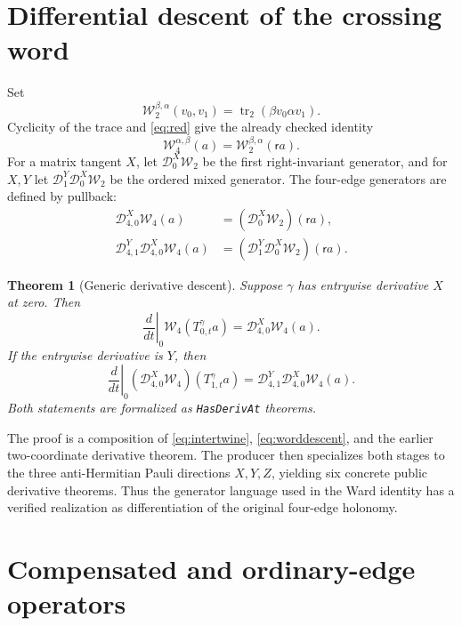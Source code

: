 \documentclass[11pt]{article}
\newtheorem{theorem}{Theorem}[section]
\theoremstyle{definition}
\newcommand{\trn}{\operatorname{tr}_2}
\newcommand{\red}{\mathsf r}
\newcommand{\W}{\mathcal W}
\newcommand{\D}{\mathcal D}
\begin{document}
\section{Differential descent of the crossing word}

Set
\[
 \W_2^{\beta,\alpha}(v_0,v_1)=\trn(\beta v_0\alpha v_1).
\]
Cyclicity of the trace and \eqref{eq:red} give the already checked identity
\begin{equation}\label{eq:worddescent}
 \W_4^{\alpha,\beta}(a)=\W_2^{\beta,\alpha}(\red a).
\end{equation}
For a matrix tangent $X$, let $\D_0^X\W_2$ be the first right-invariant
generator, and for $X,Y$ let $\D_1^Y\D_0^X\W_2$ be the ordered mixed
generator.  The four-edge generators are defined by pullback:
\begin{align}
 \D_{4,0}^{X}\W_4(a)&=(\D_0^X\W_2)(\red a),\label{eq:first}\\
 \D_{4,1}^{Y}\D_{4,0}^{X}\W_4(a)
   &=(\D_1^Y\D_0^X\W_2)(\red a).\label{eq:mixed}
\end{align}

\begin{theorem}[Generic derivative descent]\label{thm:derivative}
Suppose $\gamma$ has entrywise derivative $X$ at zero.  Then
\[
 \left.\frac d{dt}\right|_{0}\W_4(T_{0,t}^{\gamma}a)
 =\D_{4,0}^{X}\W_4(a).
\]
If the entrywise derivative is $Y$, then
\[
 \left.\frac d{dt}\right|_{0}
   (\D_{4,0}^{X}\W_4)(T_{1,t}^{\gamma}a)
 =\D_{4,1}^{Y}\D_{4,0}^{X}\W_4(a).
\]
Both statements are formalized as \texttt{HasDerivAt} theorems.
\end{theorem}

The proof is a composition of \eqref{eq:intertwine},
\eqref{eq:worddescent}, and the earlier two-coordinate derivative theorem.
The producer then specializes both stages to the three anti-Hermitian Pauli
directions $X,Y,Z$, yielding six concrete public derivative theorems.  Thus
the generator language used in the Ward identity has a verified realization
as differentiation of the original four-edge holonomy.

\section{Compensated and ordinary-edge operators}
\end{document}
